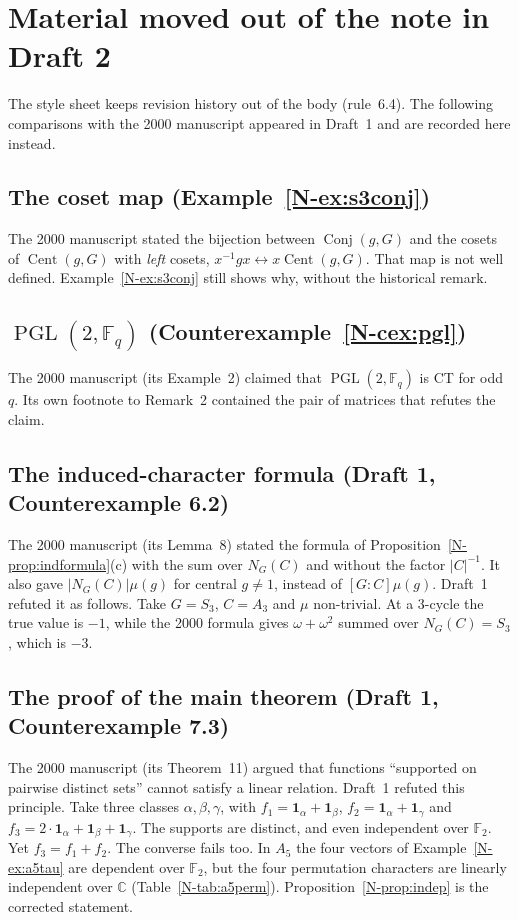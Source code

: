 \documentclass[12pt,letterpaper]{article}
\newcommand{\F}{\mathbb{F}}
\newcommand{\C}{\mathbb{C}}
\newcommand{\triv}{\mathbf{1}}
\DeclareMathOperator{\PGL}{PGL}
\DeclareMathOperator{\Cent}{Cent}
\DeclareMathOperator{\Conj}{Conj}
\begin{document}
\section{Material moved out of the note in Draft 2}\label{sec:moved}

The style sheet keeps revision history out of the body (rule~6.4). The
following comparisons with the 2000 manuscript appeared in Draft~1 and are
recorded here instead.

\subsection{The coset map (Example~\ref{N-ex:s3conj})}
The 2000 manuscript stated the bijection between $\Conj(g,G)$ and the cosets
of $\Cent(g,G)$ with \emph{left} cosets, $x^{-1}gx\leftrightarrow
x\Cent(g,G)$. That map is not well defined. Example~\ref{N-ex:s3conj} still
shows why, without the historical remark.

\subsection{\texorpdfstring{$\PGL(2,\F_q)$ (Counterexample~\ref{N-cex:pgl})}{PGL(2,q)}}
The 2000 manuscript (its Example~2) claimed that $\PGL(2,\F_q)$ is CT for odd
$q$. Its own footnote to Remark~2 contained the pair of matrices that refutes
the claim.

\subsection{The induced-character formula (Draft 1, Counterexample 6.2)}
The 2000 manuscript (its Lemma~8) stated the formula of
Proposition~\ref{N-prop:indformula}(c) with the sum over $N_G(C)$ and without
the factor $|C|^{-1}$. It also gave $|N_G(C)|\mu(g)$ for central $g\neq1$,
instead of $[G:C]\mu(g)$. Draft~1 refuted it as follows. Take $G=S_3$,
$C=A_3$ and $\mu$ non-trivial. At a $3$-cycle the true value is $-1$, while
the 2000 formula gives $\omega+\omega^2$ summed over $N_G(C)=S_3$, which is
$-3$.

\subsection{The proof of the main theorem (Draft 1, Counterexample 7.3)}
The 2000 manuscript (its Theorem~11) argued that functions ``supported on
pairwise distinct sets'' cannot satisfy a linear relation. Draft~1 refuted
this principle. Take three classes $\alpha,\beta,\gamma$, with
$f_1=\triv_\alpha+\triv_\beta$, $f_2=\triv_\alpha+\triv_\gamma$ and
$f_3=2\cdot\triv_\alpha+\triv_\beta+\triv_\gamma$. The supports are
distinct, and even independent over $\F_2$. Yet $f_3=f_1+f_2$. The converse
fails too. In $A_5$ the four vectors of Example~\ref{N-ex:a5tau} are
dependent over $\F_2$, but the four permutation characters are linearly
independent over $\C$ (Table~\ref{N-tab:a5perm}).
Proposition~\ref{N-prop:indep} is the corrected statement.
\end{document}
